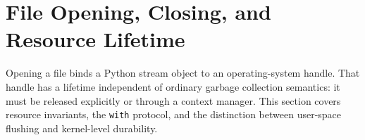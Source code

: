 \section{File Opening, Closing, and Resource Lifetime}

Opening a file binds a Python stream object to an operating-system handle. That handle has a lifetime independent of ordinary garbage collection semantics: it must be released explicitly or through a context manager. This section covers resource invariants, the \texttt{with} protocol, and the distinction between user-space flushing and kernel-level durability.

